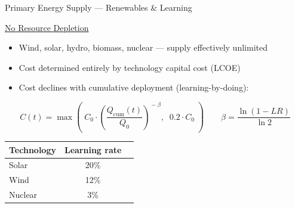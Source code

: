 \documentclass[aspectratio=169,11pt]{beamer}
\begin{document}
  \begin{frame}{Primary Energy Supply --- Renewables \& Learning}

  \underline{No Resource Depletion}

  \begin{itemize}\small
    \item Wind, solar, hydro, biomass, nuclear --- supply effectively unlimited
    \item Cost determined entirely by technology capital cost (LCOE)
    \item Cost declines with cumulative deployment (learning-by-doing):
  \end{itemize}

  \vspace{0.5em}

  \begin{equation*}
    C(t) = \max\!\left(\; C_0 \cdot \left(\frac{Q_{\text{cum}}(t)}{Q_0}\right)^{\!-\beta}, \;\; 0.2 \cdot C_0 \;\right)
    \qquad \beta = \frac{\ln(1 - LR)}{\ln 2}
  \end{equation*}

  \begin{table}[ht]
  \centering
  \footnotesize
  \begin{tabular}{lcc}
  \toprule
  Technology & Learning rate\\
  \midrule
  Solar & 20\%  \\
  Wind & 12\%  \\
  Nuclear & 3\% \\
  \bottomrule
  \end{tabular}
  \end{table}

  \end{frame}
\end{document}
